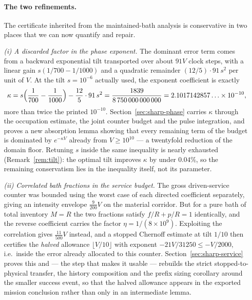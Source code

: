 \documentclass[11pt,a4paper]{article}
\theoremstyle{plain}
\theoremstyle{definition}
\theoremstyle{remark}
\begin{document}
\paragraph{The two refinements.}
The certificate inherited from the maintained-bath analysis is conservative in two places that we can now quantify and repair.

\emph{(i) A discarded factor in the phase exponent.} The dominant error term comes from a backward exponential tilt transported over about $91V$ clock steps, with a linear gain $s(1/700-1/1000)$ and a quadratic remainder $(12/5)\cdot91\,s^2$ per unit of $V$. At the tilt $s=10^{-6}$ actually used, the exponent coefficient is exactly
\[
\kappa=s\Bigl(\frac1{700}-\frac1{1000}\Bigr)-\frac{12}5\cdot91\,s^2=\frac{1839}{8\,750\,000\,000\,000}=2.1017142857\ldots\times10^{-10},
\]
more than twice the printed $10^{-10}$. Section~\ref{sec:sharp-phase} carries $\kappa$ through the occupation estimate, the joint counter budget and the pulse integration, and proves a new absorption lemma showing that every remaining term of the budget is dominated by $e^{-\kappa V}$ already from $V\ge10^{10}$ --- a twentyfold reduction of the domain floor. Retuning $s$ inside the same inequality is nearly exhausted (Remark~\ref{rem:tilt}): the optimal tilt improves $\kappa$ by under $0.04\%$, so the remaining conservatism lies in the inequality itself, not its parameter.

\emph{(ii) Correlated bath fractions in the service budget.} The gross driven-service counter was bounded using the worst case of each directed coefficient separately, giving an intensity envelope $\tfrac9{200}V$ on the material corridor. But for a pure bath of total inventory $M=R$ the two fractions satisfy $f/R+p/R=1$ identically, and the reverse coefficient carries the factor $\eta=1/(8\times10^{9})$. Exploiting the correlation gives $\tfrac{11}{500}V$ instead, and a stopped Chernoff estimate at tilt $1/10$ then certifies the \emph{halved} allowance $\lfloor V/10\rfloor$ with exponent $-21V/31250\le-V/2000$, i.e.\ inside the error already allocated to this counter. Section~\ref{sec:sharp-service} proves this and --- the step that makes it usable --- rebuilds the strict stopped-to-physical transfer, the history composition and the prefix sizing corollary around the smaller success event, so that the halved allowance appears in the exported mission conclusion rather than only in an intermediate lemma.
\end{document}
